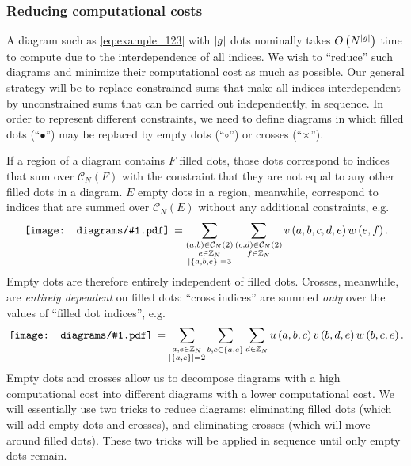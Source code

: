 \documentclass[nofootinbib,notitlepage,11pt]{revtex4-2}
\newcommand{\f}[2]{\dfrac{#1}{#2}} %
\newcommand{\p}[1]{\left(#1\right)} %
\renewcommand{\set}[1]{\left\{#1\right\}} %
\newcommand{\1}{\mathds{1}}
\newcommand{\C}{\mathcal{C}}
\newcommand{\ZZ}{\mathbb{Z}}
\newcommand{\diagram}[1]
{\,\texttt{[image: diagrams/\#1.pdf]}\,}
\begin{document}
\subsubsection{Reducing computational costs}

A diagram such as \eqref{eq:example_123} with $\abs{g}$ dots nominally
takes $O\p{N^{\abs{g}}}$ time to compute due to the interdependence of
all indices.  We wish to ``reduce'' such diagrams and minimize their
computational cost as much as possible.  Our general strategy will be
to replace constrained sums that make all indices interdependent by
unconstrained sums that can be carried out independently, in sequence.
In order to represent different constraints, we need to define
diagrams in which filled dots (``$\bullet$'') may be replaced by empty
dots (``$\circ$'') or crosses (``$\bm\times$'').

If a region of a diagram contains $F$ filled dots, those dots
correspond to indices that sum over $\C_N\p{F}$ with the constraint
that they are not equal to any other filled dots in a diagram.  $E$
empty dots in a region, meanwhile, correspond to indices that are
summed over $\C_N\p{E}$ without any additional constraints, e.g.
\begin{align}
  \diagram{example_o}
  = \sum_{\substack{\p{a,b}\in\C_N\p{2}\\e\in\ZZ_N\\
      \abs{\set{a,b,e}}=3}}
  \sum_{\substack{\p{c,d}\in\C_N\p{2}\\f\in\ZZ_N}}
  v\p{a,b,c,d,e} w\p{e,f}.
\end{align}
Empty dots are therefore entirely independent of filled dots.
Crosses, meanwhile, are {\it entirely dependent} on filled dots:
``cross indices'' are summed {\it only} over the values of ``filled
dot indices'', e.g.
\begin{align}
  \diagram{example_x}
  = \sum_{\substack{a,e\in\ZZ_N\\\abs{\set{a,e}}=2}}
  \sum_{b,c\in\set{a,e}} \sum_{d\in\ZZ_N}
  u\p{a,b,c} v\p{b,d,e} w\p{b,c,e}.
\end{align}
Empty dots and crosses allow us to decompose diagrams with a high
computational cost into different diagrams with a lower computational
cost.  We will essentially use two tricks to reduce diagrams:
eliminating filled dots (which will add empty dots and crosses), and
eliminating crosses (which will move around filled dots).  These two
tricks will be applied in sequence until only empty dots remain.
\end{document}
